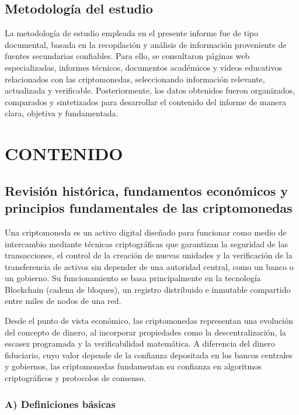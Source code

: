 \documentclass[12pt,a4paper]{article}
\begin{document}
\subsection{Metodología del estudio}

La metodología de estudio empleada en el presente informe fue de tipo documental, basada
en la recopilación y análisis de información proveniente de fuentes secundarias confiables.
Para ello, se consultaron páginas web especializadas, informes técnicos, documentos
académicos y videos educativos relacionados con las criptomonedas, seleccionando
información relevante, actualizada y verificable. Posteriormente, los datos obtenidos fueron
organizados, comparados y sintetizados para desarrollar el contenido del informe de
manera clara, objetiva y fundamentada.

\section{CONTENIDO}

\subsection{Revisión histórica, fundamentos económicos y principios fundamentales de las criptomonedas}

Una criptomoneda es un activo digital diseñado para funcionar como medio de intercambio
mediante técnicas criptográficas que garantizan la seguridad de las transacciones, el control
de la creación de nuevas unidades y la verificación de la transferencia de activos sin
depender de una autoridad central, como un banco o un gobierno. Su funcionamiento se
basa principalmente en la tecnología Blockchain (cadena de bloques), un registro distribuido
e inmutable compartido entre miles de nodos de una red.

Desde el punto de vista económico, las criptomonedas representan una evolución del
concepto de dinero, al incorporar propiedades como la descentralización, la escasez
programada y la verificabilidad matemática. A diferencia del dinero fiduciario, cuyo valor
depende de la confianza depositada en los bancos centrales y gobiernos, las criptomonedas
fundamentan su confianza en algoritmos criptográficos y protocolos de consenso.

\subsubsection*{A) \quad Definiciones básicas}
\end{document}
